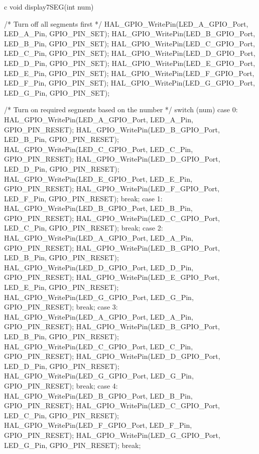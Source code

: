 \documentclass{hcmut-report}
\begin{document}
\begin{code}{c}
void display7SEG(int num) {
      /* Turn off all segments first */
      HAL_GPIO_WritePin(LED_A_GPIO_Port, LED_A_Pin, GPIO_PIN_SET);
      HAL_GPIO_WritePin(LED_B_GPIO_Port, LED_B_Pin, GPIO_PIN_SET);
      HAL_GPIO_WritePin(LED_C_GPIO_Port, LED_C_Pin, GPIO_PIN_SET);
      HAL_GPIO_WritePin(LED_D_GPIO_Port, LED_D_Pin, GPIO_PIN_SET);
      HAL_GPIO_WritePin(LED_E_GPIO_Port, LED_E_Pin, GPIO_PIN_SET);
      HAL_GPIO_WritePin(LED_F_GPIO_Port, LED_F_Pin, GPIO_PIN_SET);
      HAL_GPIO_WritePin(LED_G_GPIO_Port, LED_G_Pin, GPIO_PIN_SET);

      /* Turn on required segments based on the number */
      switch (num) {
          case 0:
              HAL_GPIO_WritePin(LED_A_GPIO_Port, LED_A_Pin, GPIO_PIN_RESET);
              HAL_GPIO_WritePin(LED_B_GPIO_Port, LED_B_Pin, GPIO_PIN_RESET);
              HAL_GPIO_WritePin(LED_C_GPIO_Port, LED_C_Pin, GPIO_PIN_RESET);
              HAL_GPIO_WritePin(LED_D_GPIO_Port, LED_D_Pin, GPIO_PIN_RESET);
              HAL_GPIO_WritePin(LED_E_GPIO_Port, LED_E_Pin, GPIO_PIN_RESET);
              HAL_GPIO_WritePin(LED_F_GPIO_Port, LED_F_Pin, GPIO_PIN_RESET);
              break;
          case 1:
              HAL_GPIO_WritePin(LED_B_GPIO_Port, LED_B_Pin, GPIO_PIN_RESET);
              HAL_GPIO_WritePin(LED_C_GPIO_Port, LED_C_Pin, GPIO_PIN_RESET);
              break;
          case 2:
              HAL_GPIO_WritePin(LED_A_GPIO_Port, LED_A_Pin, GPIO_PIN_RESET);
              HAL_GPIO_WritePin(LED_B_GPIO_Port, LED_B_Pin, GPIO_PIN_RESET);
              HAL_GPIO_WritePin(LED_D_GPIO_Port, LED_D_Pin, GPIO_PIN_RESET);
              HAL_GPIO_WritePin(LED_E_GPIO_Port, LED_E_Pin, GPIO_PIN_RESET);
              HAL_GPIO_WritePin(LED_G_GPIO_Port, LED_G_Pin, GPIO_PIN_RESET);
              break;
          case 3:
              HAL_GPIO_WritePin(LED_A_GPIO_Port, LED_A_Pin, GPIO_PIN_RESET);
              HAL_GPIO_WritePin(LED_B_GPIO_Port, LED_B_Pin, GPIO_PIN_RESET);
              HAL_GPIO_WritePin(LED_C_GPIO_Port, LED_C_Pin, GPIO_PIN_RESET);
              HAL_GPIO_WritePin(LED_D_GPIO_Port, LED_D_Pin, GPIO_PIN_RESET);
              HAL_GPIO_WritePin(LED_G_GPIO_Port, LED_G_Pin, GPIO_PIN_RESET);
              break;
          case 4:
              HAL_GPIO_WritePin(LED_B_GPIO_Port, LED_B_Pin, GPIO_PIN_RESET);
              HAL_GPIO_WritePin(LED_C_GPIO_Port, LED_C_Pin, GPIO_PIN_RESET);
              HAL_GPIO_WritePin(LED_F_GPIO_Port, LED_F_Pin, GPIO_PIN_RESET);
              HAL_GPIO_WritePin(LED_G_GPIO_Port, LED_G_Pin, GPIO_PIN_RESET);
              break;
}}
\end{code}
\end{document}
